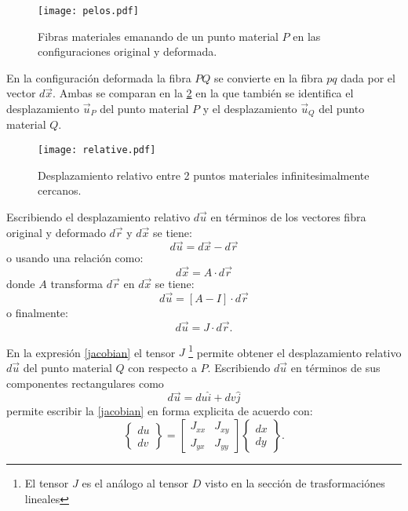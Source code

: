 \documentclass[../notas medios.tex]{subfiles}
\begin{document}
\begin{figure}[H]
\centering
	\texttt{[image: pelos.pdf]}
	\caption{Fibras materiales emanando de un punto material $P$ en las configuraciones original y deformada.}
	\label{pelos}
\end{figure}

En la configuración deformada la fibra $PQ$ se convierte en la fibra $pq$ dada por el vector $d\vec{x}$. Ambas se comparan en la \cref{relative} en la que también se identifica el desplazamiento ${{\vec u}_P}$ del punto material $P$ y el desplazamiento ${{\vec u}_Q}$  del punto material $Q$.

\begin{figure}[H]
\centering
	\texttt{[image: relative.pdf]}
	\caption{Desplazamiento relativo entre 2 puntos materiales infinitesimalmente cercanos.}
	\label{relative}
\end{figure}

Escribiendo el desplazamiento relativo $d\vec u$  en términos de los vectores fibra original y deformado $d\vec{r}$ y $d\vec{x}$  se tiene:
\[d\vec u = d\vec x - d\vec r\]
o usando una relación como:
\[d\vec x = A \cdot d\vec r\]
donde $A$ transforma $d\vec{r}$ en $d\vec{x}$ se tiene:
\[d\vec u = \left[ {A - I} \right] \cdot d\vec r\]
o finalmente:
\begin{equation}
d\vec u = J \cdot d\vec r.
\label{jacobian}
\end{equation}

En la expresión \cref{jacobian} el tensor $J$ \footnote{El tensor $J$ es el análogo al tensor $D$ visto en la sección de trasformaciónes lineales} permite obtener el desplazamiento relativo $d\vec{u}$ del punto material $Q$ con respecto a $P$. Escribiendo $d\vec{u}$ en términos de sus componentes rectangulares como
\[d\vec u = du\hat i + dv\hat j\]
permite escribir la \cref{jacobian} en forma explicita de acuerdo con:
\[\left\{ {\begin{array}{*{20}{c}}
{du}\\
{dv}
\end{array}} \right\} = \left[ {\begin{array}{*{20}{c}}
{{J_{xx}}}&{{J_{xy}}}\\
{{J_{yx}}}&{{J_{yy}}}
\end{array}} \right]\left\{ {\begin{array}{*{20}{c}}
{dx}\\
{dy}
\end{array}} \right\}.\]
\end{document}
